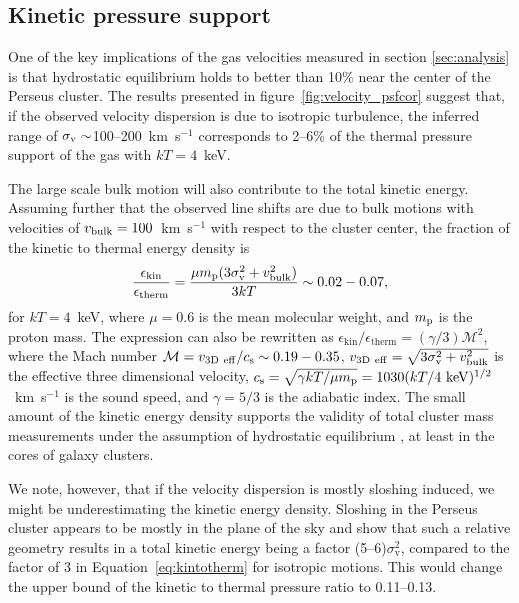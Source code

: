 \subsection{Kinetic pressure support}
\label{sec:pressure}

One of the key implications of the gas velocities measured in section \ref{sec:analysis} is that hydrostatic equilibrium holds to better than 10\% near the center of the Perseus cluster. The results presented in figure~\ref{fig:velocity_psfcor} suggest that, if the observed velocity dispersion is due to isotropic turbulence, the inferred range of $\sigma_{\rm v} \sim$100--200~km~s$^{-1}$ corresponds to 2--6\% of the thermal pressure support of the gas with $kT = 4$~keV.

The large scale bulk motion will also contribute to the total kinetic energy. Assuming further that the observed line shifts are due to bulk motions with velocities of $v_{\rm bulk} = 100$~km~s$^{-1}$ with respect to the cluster center, the fraction of the kinetic to thermal energy density is
\begin{eqnarray}
\frac{\epsilon_{\mathrm{kin}}}{\epsilon_{\mathrm{therm}}}
= \frac{\mu m_{\rm p}(3\sigma^{2}_{\rm v}+v^{2}_{\rm bulk})}{3kT}
\sim 0.02 - 0.07,\label{eq:kintotherm}
\end{eqnarray}
for $kT=4$~keV, where $\mu=0.6$ is the mean molecular weight, and $m_{\rm p}$ is the proton mass. The expression can also be rewritten as $\epsilon_{\mathrm{kin}}/\epsilon_{\mathrm{therm}}=(\gamma/3)\mathcal{M}^2$, where the Mach number $\mathcal{M}=v_{\rm 3D~eff}/c_{\rm s} \sim 0.19-0.35$, $v_{\rm 3D~eff}=\sqrt{3\sigma^{2}_{\rm v}+v^{2}_{\rm bulk}}$ is the effective three dimensional velocity, $c_{\mathrm{s}}=\sqrt{\gamma kT/\mu m_{\mathrm{p}}} = 1030 (kT/4~{\rm keV})^{1/2}$~km~s$^{-1}$ is the sound speed, and $\gamma=5/3$ is the adiabatic index. The small amount of the kinetic energy density supports the validity of total cluster mass measurements under the assumption of hydrostatic equilibrium \citep[e.g.,][]{Allen11}, at least in the cores of galaxy clusters.

We note, however, that if the velocity dispersion is mostly sloshing induced, we might be underestimating the kinetic energy density. Sloshing in the Perseus cluster appears to be mostly in the plane of the sky and \citet{ZuHone13} show that such a relative geometry results in a total kinetic energy being a factor (5--6)$\sigma_\mathrm{v}^2$, compared to the factor of 3 in Equation~\ref{eq:kintotherm} for isotropic motions. This would change the upper bound of the kinetic to thermal pressure ratio to 0.11--0.13.

